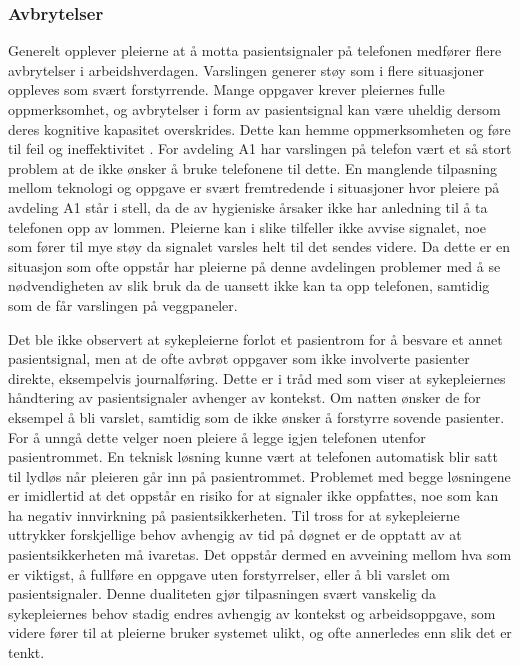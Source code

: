 \subsubsection{Avbrytelser}
Generelt opplever pleierne at å motta pasientsignaler på telefonen medfører flere avbrytelser i arbeidshverdagen. Varslingen generer støy som i flere situasjoner oppleves som svært forstyrrende. Mange oppgaver krever pleiernes fulle oppmerksomhet, og avbrytelser i form av pasientsignal kan være uheldig dersom deres kognitive kapasitet overskrides. Dette kan hemme oppmerksomheten og føre til feil og ineffektivitet \citep{Ebright10, Parker00}. For avdeling A1 har varslingen på telefon vært et så stort problem at de ikke ønsker å bruke telefonene til dette. En manglende tilpasning mellom teknologi og oppgave er svært fremtredende i situasjoner hvor pleiere på avdeling A1 står i stell, da de av hygieniske årsaker ikke har anledning til å ta telefonen opp av lommen. Pleierne kan i slike tilfeller ikke avvise signalet, noe som fører til mye støy da signalet varsles helt til det sendes videre. Da dette er en situasjon som ofte oppstår har pleierne på denne avdelingen problemer med å se nødvendigheten av slik bruk da de uansett ikke kan ta opp telefonen, samtidig som de får varslingen på veggpaneler.

\noindent
Det ble ikke observert at sykepleierne forlot et pasientrom for å besvare et annet pasientsignal, men at de ofte avbrøt oppgaver som ikke involverte pasienter direkte, eksempelvis journalføring. Dette er i tråd med \citet{klemets13} som viser at sykepleiernes håndtering av pasientsignaler avhenger av kontekst. Om natten ønsker de for eksempel å bli varslet, samtidig som de ikke ønsker å forstyrre sovende pasienter. For å unngå dette velger noen pleiere å legge igjen telefonen utenfor pasientrommet. En teknisk løsning kunne vært at telefonen automatisk blir satt til lydløs når pleieren går inn på pasientrommet. Problemet med begge løsningene er imidlertid at det oppstår en risiko for at signaler ikke oppfattes, noe som kan ha negativ innvirkning på pasientsikkerheten. Til tross for at sykepleierne uttrykker forskjellige behov avhengig av tid på døgnet er de opptatt av at pasientsikkerheten må ivaretas. Det oppstår dermed en avveining mellom hva som er viktigst, å fullføre en oppgave uten forstyrrelser, eller å bli varslet om pasientsignaler. Denne dualiteten gjør tilpasningen svært vanskelig da sykepleiernes behov stadig endres avhengig av kontekst og arbeidsoppgave, som videre fører til at pleierne bruker systemet ulikt, og ofte annerledes enn slik det er tenkt. 

